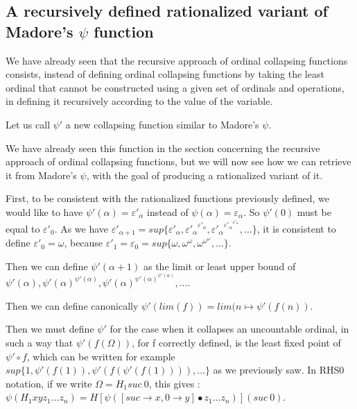 \documentclass[10pt]{article}
\begin{document}
\subsection{A recursively defined rationalized variant of Madore's \( \psi \) function}

We have already seen that the recursive approach of ordinal collapsing functions consists, instead of defining ordinal collapsing functions by taking the least ordinal that cannot be constructed using a given set of ordinals and operations, in defining it recursively according to the value of the variable.

Let us call \( \psi' \) a new collapsing function similar to Madore's \( \psi \). 

We have already seen this function in the section concerning the recursive approach of ordinal collapsing functions, but we will now see how we can retrieve it from Madore's \( \psi \), with the goal of producing a rationalized variant of it.

First, to be consistent with the rationalized functions previously defined, we would like to have \( \psi'(\alpha) = \varepsilon'_\alpha \) instead of \( \psi(\alpha) = \varepsilon_\alpha \). So \( \psi'(0) \) must be equal to \( \varepsilon'_0 \). As we have \( \varepsilon'_{\alpha+1} = sup \lbrace \varepsilon'_\alpha, {\varepsilon'_\alpha}^{\varepsilon'_\alpha}, {\varepsilon'_\alpha}^{{\varepsilon'_\alpha}^{\varepsilon'_\alpha}}, \ldots \rbrace \), it is consistent to define \( \varepsilon'_0 = \omega \), because \( \varepsilon'_1 = \varepsilon_0 = sup \lbrace \omega, \omega^\omega, \omega^{\omega^\omega}, \ldots \rbrace \).

Then we can define \( \psi'(\alpha+1) \) as the limit or least upper bound of \( \psi'(\alpha), \psi'(\alpha)^{\psi'(\alpha)}, \psi'(\alpha)^{\psi'(\alpha)^{\psi'(\alpha)}}, \ldots \).

Then we can define canonically \( \psi'(lim(f)) = lim(n \mapsto \psi'(f(n)) \).

Then we must define \( \psi' \) for the case when it collapses an uncountable ordinal, in such a way that \( \psi'(f(\Omega)) \), for f correctly defined, is the least fixed point of \( \psi' \circ f \), which can be written for example \( sup \lbrace 1, \psi'(f(1)), \psi'(f(\psi'(f(1)))), \ldots \rbrace \)  as we previously saw. In RHS0 notation, if we write \( \Omega = H_1 suc\ 0 \), this gives : \( \psi (H_1 x y z_1 \ldots z_n) = H [\psi([suc \rightarrow x, 0 \rightarrow y] \bullet z_1 \ldots z_n)] (suc\ 0) \).
\end{document}
